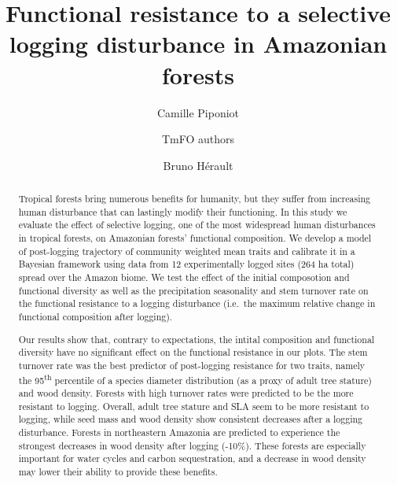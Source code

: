 \documentclass[]{elsarticle} %
\begin{document}
\begin{frontmatter}

  \title{Functional resistance to a selective logging disturbance in Amazonian
forests}
    \author[1]{Camille Piponiot}
    \author[]{TmFO authors}
  
  
    \author[1, 2]{Bruno Hérault}
  
      \address[1]{Cirad, UR Forets et Societes, Montferrier-sur-Lez, France}
    \address[2]{INPHB, Yamoussoukro, Cote d'Ivoire}
  
  \begin{abstract}
  Tropical forests bring numerous benefits for humanity, but they suffer
  from increasing human disturbance that can lastingly modify their
  functioning. In this study we evaluate the effect of selective logging,
  one of the most widespread human disturbances in tropical forests, on
  Amazonian forests' functional composition. We develop a model of
  post-logging trajectory of community weighted mean traits and calibrate
  it in a Bayesian framework using data from 12 experimentally logged
  sites (264 ha total) spread over the Amazon biome. We test the effect of
  the initial composotion and functional diversity as well as the
  precipitation seasonality and stem turnover rate on the functional
  resistance to a logging disturbance (i.e.~the maximum relative change in
  functional composition after logging).
  
  Our results show that, contrary to expectations, the intital composition
  and functional diversity have no significant effect on the functional
  resistance in our plots. The stem turnover rate was the best predictor
  of post-logging resistance for two traits, namely the
  95\textsuperscript{th} percentile of a species diameter distribution (as
  a proxy of adult tree stature) and wood density. Forests with high
  turnover rates were predicted to be the more resistant to logging.
  Overall, adult tree stature and SLA seem to be more resistant to
  logging, while seed mass and wood density show consistent decreases
  after a logging disturbance. Forests in northeastern Amazonia are
  predicted to experience the strongest decreases in wood density after
  logging (-10\%). These forests are especially important for water cycles
  and carbon sequestration, and a decrease in wood density may lower their
  ability to provide these benefits.
  \end{abstract}
  
 \end{frontmatter}
\end{document}
